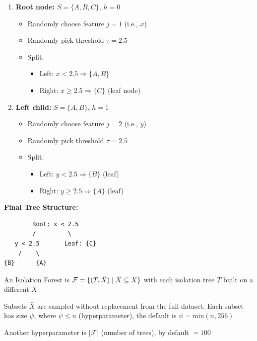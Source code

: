 \documentclass{article}
\begin{document}
\begin{enumerate}
    \item \textbf{Root node:} $S = \{A, B, C\}$, $h = 0$
    \begin{itemize}
        \item Randomly choose feature $j = 1$ (i.e., $x$)
        \item Randomly pick threshold $\tau = 2.5$
        \item Split:
        \begin{itemize}
            \item Left: $x < 2.5 \Rightarrow \{A, B\}$
            \item Right: $x \ge 2.5 \Rightarrow \{C\}$ (leaf node)
        \end{itemize}
    \end{itemize}

    \item \textbf{Left child:} $S = \{A, B\}$, $h = 1$
    \begin{itemize}
        \item Randomly choose feature $j = 2$ (i.e., $y$)
        \item Randomly pick threshold $\tau = 2.5$
        \item Split:
        \begin{itemize}
            \item Left: $y < 2.5 \Rightarrow \{B\}$ (leaf)
            \item Right: $y \ge 2.5 \Rightarrow \{A\}$ (leaf)
        \end{itemize}
    \end{itemize}
\end{enumerate}

\textbf{Final Tree Structure:}

\begin{verbatim}
        Root: x < 2.5
        /         \
   y < 2.5       Leaf: {C}
    /    \
{B}      {A}
\end{verbatim}

An Isolation Forest is $\mathcal{F} = \{(T, \bar{X}) \mid \bar{X} \subseteq X\}$ with each isolation tree $T$ built on a different $\bar{X}$

Subsets $\bar{X}$ are sampled without replacement from the full dataset. Each subset has size $\psi$, where $\psi \leq n$ (hyperparameter), the default is $\psi = \text{min}(n, 256)$

Another hyperparameter is $| \mathcal{F} |$ (number of trees), by default $=100$
\end{document}
